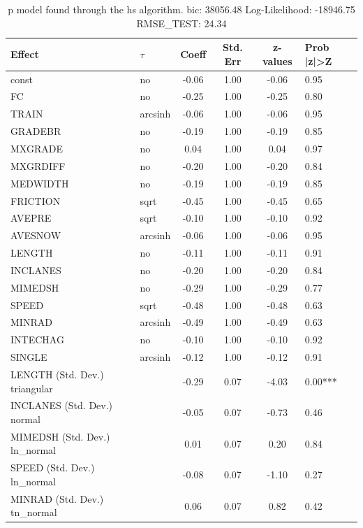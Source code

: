 \begin{table}
	\caption{p model found through the hs algorithm. bic: 38056.48 Log-Likelihood: -18946.75 RMSE_TEST: 24.34}
	\begin{center}
		\begin{tabular}{|l|l|c|c|c|l|}
			\hline
			Effect & $\tau$ & Coeff & Std. Err & z-values & Prob |z|>Z \\
			\hline
			const & no & -0.06 & 1.00 & -0.06 & 0.95 \\
			\hline
			FC & no & -0.25 & 1.00 & -0.25 & 0.80 \\
			\hline
			TRAIN & arcsinh & -0.06 & 1.00 & -0.06 & 0.95 \\
			\hline
			GRADEBR & no & -0.19 & 1.00 & -0.19 & 0.85 \\
			\hline
			MXGRADE & no & 0.04 & 1.00 & 0.04 & 0.97 \\
			\hline
			MXGRDIFF & no & -0.20 & 1.00 & -0.20 & 0.84 \\
			\hline
			MEDWIDTH & no & -0.19 & 1.00 & -0.19 & 0.85 \\
			\hline
			FRICTION & sqrt & -0.45 & 1.00 & -0.45 & 0.65 \\
			\hline
			AVEPRE & sqrt & -0.10 & 1.00 & -0.10 & 0.92 \\
			\hline
			AVESNOW & arcsinh & -0.06 & 1.00 & -0.06 & 0.95 \\
			\hline
			LENGTH & no & -0.11 & 1.00 & -0.11 & 0.91 \\
			\hline
			INCLANES & no & -0.20 & 1.00 & -0.20 & 0.84 \\
			\hline
			MIMEDSH & no & -0.29 & 1.00 & -0.29 & 0.77 \\
			\hline
			SPEED & sqrt & -0.48 & 1.00 & -0.48 & 0.63 \\
			\hline
			MINRAD & arcsinh & -0.49 & 1.00 & -0.49 & 0.63 \\
			\hline
			INTECHAG & no & -0.10 & 1.00 & -0.10 & 0.92 \\
			\hline
			SINGLE & arcsinh & -0.12 & 1.00 & -0.12 & 0.91 \\
			\hline
			LENGTH (Std. Dev.) triangular &  & -0.29 & 0.07 & -4.03 & 0.00*** \\
			\hline
			INCLANES (Std. Dev.) normal &  & -0.05 & 0.07 & -0.73 & 0.46 \\
			\hline
			MIMEDSH (Std. Dev.) ln_normal &  & 0.01 & 0.07 & 0.20 & 0.84 \\
			\hline
			SPEED (Std. Dev.) ln_normal &  & -0.08 & 0.07 & -1.10 & 0.27 \\
			\hline
			MINRAD (Std. Dev.) tn_normal &  & 0.06 & 0.07 & 0.82 & 0.42 \\

\end{tabular}
\end{center}
\end{table}

